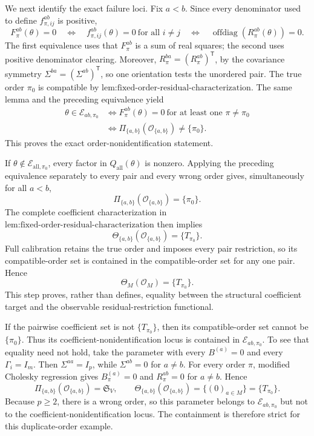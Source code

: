 We next identify the exact failure loci.  Fix \(a<b\).  Since every denominator used to define \(f_{\pi,ij}^{ab}\) is positive,
\[
F_\pi^{ab}(\theta)=0
\quad\Longleftrightarrow\quad
f_{\pi,ij}^{ab}(\theta)=0\ \text{for all }i\ne j
\quad\Longleftrightarrow\quad
\operatorname{offdiag}(R_\pi^{ab}(\theta))=0.
\]
The first equivalence uses that \(F_\pi^{ab}\) is a sum of real squares; the second uses positive denominator clearing.  Moreover, \(R_\pi^{ba}=(R_\pi^{ab})^{\mathsf T}\), by the covariance symmetry \(\Sigma^{ba}=(\Sigma^{ab})^{\mathsf T}\), so one orientation tests the unordered pair.  The true order \(\pi_0\) is compatible by \(\text{lem:fixed-order-residual-characterization}\).  The same lemma and the preceding equivalence yield
\[
\begin{aligned}
\theta\in\mathcal E_{ab,\pi_0}
&\Longleftrightarrow
F_\pi^{ab}(\theta)=0\ \text{for at least one }\pi\ne\pi_0\\
&\Longleftrightarrow
\Pi_{\{a,b\}}(\mathcal O_{\{a,b\}})\ne\{\pi_0\}.
\end{aligned}
\]
This proves the exact order-nonidentification statement.

If \(\theta\notin\mathcal E_{\mathrm{all},\pi_0}\), every factor in \(Q_{\mathrm{all}}(\theta)\) is nonzero.  Applying the preceding equivalence separately to every pair and every wrong order gives, simultaneously for all \(a<b\),
\[
\Pi_{\{a,b\}}(\mathcal O_{\{a,b\}})=\{\pi_0\}.
\]
The complete coefficient characterization in \(\text{lem:fixed-order-residual-characterization}\) then implies
\[
\Theta_{\{a,b\}}(\mathcal O_{\{a,b\}})=\{T_{\pi_0}\}.
\]
Full calibration retains the true order and imposes every pair restriction, so its compatible-order set is contained in the compatible-order set for any one pair.  Hence
\[
\Theta_M(\mathcal O_M)=\{T_{\pi_0}\}.
\]
This step proves, rather than defines, equality between the structural coefficient target and the observable residual-restriction functional.

If the pairwise coefficient set is not \(\{T_{\pi_0}\}\), then its compatible-order set cannot be \(\{\pi_0\}\).  Thus its coefficient-nonidentification locus is contained in \(\mathcal E_{ab,\pi_0}\).  To see that equality need not hold, take the parameter with every \(B^{(a)}=0\) and every \(\Gamma_i=I_m\).  Then \(\Sigma^{aa}=I_p\), while \(\Sigma^{ab}=0\) for \(a\ne b\).  For every order \(\pi\), modified Cholesky regression gives \(B_\pi^{(a)}=0\) and \(R_\pi^{ab}=0\) for \(a\ne b\).  Hence
\[
\Pi_{\{a,b\}}(\mathcal O_{\{a,b\}})=\mathfrak S_V,
\qquad
\Theta_{\{a,b\}}(\mathcal O_{\{a,b\}})=\{(0)_{a\in M}\}=
\{T_{\pi_0}\}.
\]
Because \(p\ge2\), there is a wrong order, so this parameter belongs to \(\mathcal E_{ab,\pi_0}\) but not to the coefficient-nonidentification locus.  The containment is therefore strict for this duplicate-order example.

